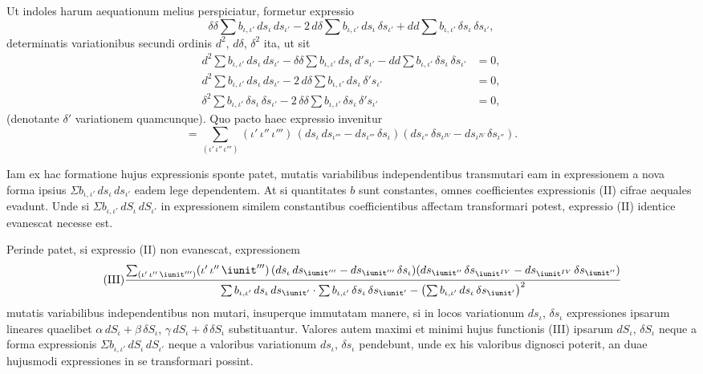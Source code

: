 \documentclass[12pt,a4paper]{article}
\begin{document}
Ut indoles harum aequationum melius perspiciatur, formetur expressio
\[
\delta\delta \sum b_{\iota,\iota'}\, ds_{\iota}\, ds_{\iota'}
- 2\, d\delta \sum b_{\iota,\iota'}\, ds_{\iota}\, \delta s_{\iota'}
+ dd \sum b_{\iota,\iota'}\, \delta s_{\iota}\, \delta s_{\iota'},
\]
determinatis variationibus secundi ordinis $d^2$, $d\delta$, $\delta^2$ ita, ut sit
\[
\begin{aligned}
d^2 \sum b_{\iota,\iota'}\, ds_{\iota}\, ds_{\iota'}
 - \delta\delta \sum b_{\iota,\iota'}\, ds_{\iota}\, d's_{\iota'}
 - dd \sum b_{\iota,\iota'}\, \delta s_{\iota}\, \delta s_{\iota'} &= 0,\\
d^2 \sum b_{\iota,\iota'}\, ds_{\iota}\, ds_{\iota'}
 - 2\, d\delta \sum b_{\iota,\iota'}\, ds_{\iota}\, \delta's_{\iota'} &= 0,\\
\delta^2 \sum b_{\iota,\iota'}\, \delta s_{\iota}\, \delta s_{\iota'}
 - 2\, \delta\delta \sum b_{\iota,\iota'}\, \delta s_{\iota}\, \delta's_{\iota'} &= 0,
\end{aligned}
\]
(denotante $\delta'$ variationem quamcunque). Quo pacto haec expressio invenitur
\begin{equation}\label{eq:II}
\tag{II}
= \sum_{(\iota'\, \iota''\, \iota''')}
 (\iota'\, \iota''\, \iota''')\,
 (ds_{\iota}\, ds_{\iota'''} - ds_{\iota'''}\, \delta s_{\iota})
 (ds_{\iota''}\, \delta s_{\iota^{IV}} - ds_{\iota^{IV}}\, \delta s_{\iota''}).
\end{equation}

Iam ex hac formatione hujus expressionis sponte patet, mutatis
variabilibus independentibus transmutari eam in expressionem a nova
forma ipsius $\Sigma b_{\iota,\iota'}\, ds_{\iota}\, ds_{\iota'}$ eadem lege dependentem.
At si quantitates $b$ sunt constantes, omnes coefficientes expressionis
(II) cifrae aequales evadunt. Unde si
$\Sigma b_{\iota,\iota'}\, dS_{\iota}\, dS_{\iota'}$ in expressionem similem
 constantibus coefficientibus affectam transformari potest, expressio (II)
 identice evanescat necesse est.

Perinde patet, si expressio (II) non evanescat, expressionem
\begin{equation}\label{eq:III}
\tag{III}
\frac{\sum_{(\iota'\, \iota''\, \iunit''')}
 (\iota'\, \iota''\, \iunit''')\,
 (ds_{\iota}\, ds_{\iunit'''} - ds_{\iunit'''}\, \delta s_{\iota})
 (ds_{\iunit''}\, \delta s_{\iunit^{IV}} - ds_{\iunit^{IV}}\, \delta s_{\iunit''})}
 {\sum b_{\iota,\iota'}\, ds_{\iota}\, ds_{\iunit'} \cdot
  \sum b_{\iota,\iota'}\, \delta s_{\iota}\, \delta s_{\iunit'}
  - \bigl(\sum b_{\iota,\iota'}\, ds_{\iota}\, \delta s_{\iunit'}\bigr)^2}
\end{equation}
mutatis variabilibus independentibus non mutari, insuperque immutatam
 manere, si in locos variationum $ds_{\iota}$, $\delta s_{\iota}$ expressiones
ipsarum lineares quaelibet $\alpha\, dS_{\iota} + \beta\, \delta S_{\iota}$,
$\gamma\, dS_{\iota} + \delta\, \delta S_{\iota}$ substituantur. Valores
 autem maximi et minimi hujus functionis (III) ipsarum $dS_{\iota}$,
$\delta S_{\iota}$ neque a forma expressionis
$\Sigma b_{\iota,\iota'}\, dS_{\iota}\, dS_{\iota'}$ neque a valoribus variationum
$ds_{\iota}$, $\delta s_{\iota}$ pendebunt, unde ex his valoribus dignosci
 poterit, an duae hujusmodi expressiones in se transformari possint.
\end{document}
